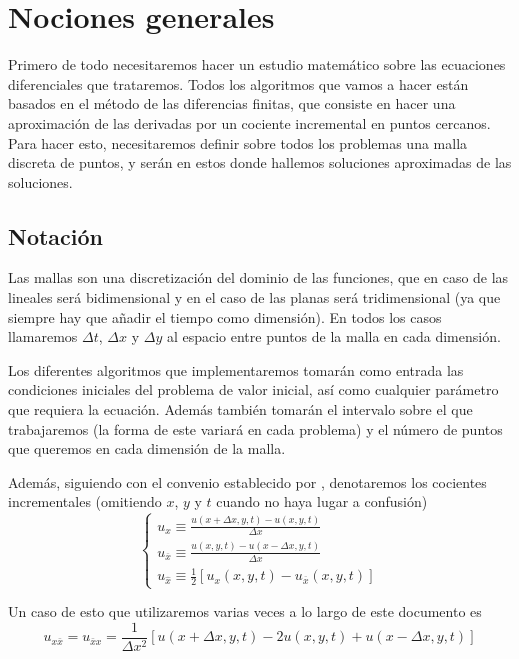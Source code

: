 \section{Nociones generales}
Primero de todo necesitaremos hacer un estudio matemático sobre las ecuaciones diferenciales que trataremos. Todos los algoritmos que vamos a hacer están basados en el método de las diferencias finitas, que consiste en hacer una aproximación de las derivadas por un cociente incremental en puntos cercanos. Para hacer esto, necesitaremos definir sobre todos los problemas una malla discreta de puntos, y serán en estos donde hallemos soluciones aproximadas de las soluciones.

\subsection{Notación}\label{sec:notacion}
Las mallas son una discretización del dominio de las funciones, que en caso de las lineales será bidimensional y en el caso de las planas será tridimensional (ya que siempre hay que añadir el tiempo como dimensión). En todos los casos llamaremos $\Delta t$, $\Delta x$ y $\Delta y$ al espacio entre puntos de la malla en cada dimensión.

Los diferentes algoritmos que implementaremos tomarán como entrada las condiciones iniciales del problema de valor inicial, así como cualquier parámetro que requiera la ecuación. Además también tomarán el intervalo sobre el que trabajaremos (la forma de este variará en cada problema) y el número de puntos que queremos en cada dimensión de la malla.

Además, siguiendo con el convenio establecido por \citet{anummeth}, denotaremos los cocientes incrementales (omitiendo $x$, $y$ y $t$ cuando no haya lugar a confusión)
\[
\begin{cases}
	u_x \equiv \frac{u(x+\Delta x,y,t)-u(x,y,t)}{\Delta x} \\
	u_{\overline{x}} \equiv \frac{u(x,y,t)-u(x-\Delta x,y,t)}{\Delta x} \\
	u_{\hat{x}} \equiv \frac{1}{2}[u_x(x,y,t)-u_{\overline{x}}(x,y,t)]
\end{cases}
\]

Un caso de esto que utilizaremos varias veces a lo largo de este documento es
\begin{equation*}
	u_{x\bar{x}} = u_{\bar{x}x} = \frac{1}{\Delta x^2}[u(x+\Delta x,y,t) - 2u(x,y,t) + u(x-\Delta x,y,t)]
\end{equation*}

